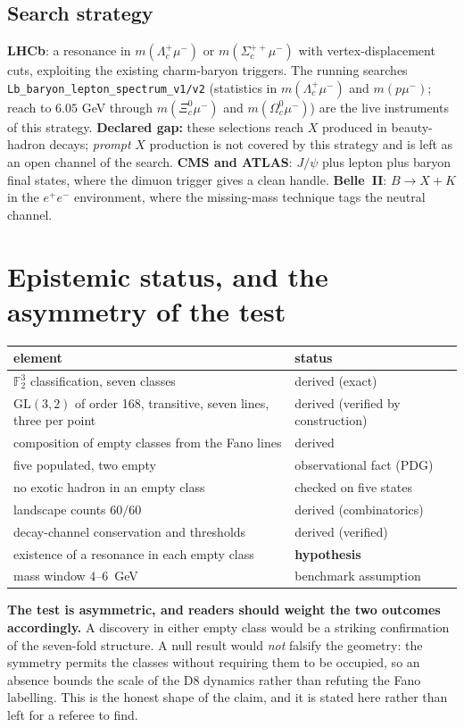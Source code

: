 \subsection{Search strategy}
\textbf{LHCb}: a resonance in $m(\Lambda_c^+\mu^-)$ or $m(\Sigma_c^{++}\mu^-)$ with vertex-displacement cuts, exploiting the existing charm-baryon triggers. The running searches \texttt{Lb\_baryon\_lepton\_spectrum\_v1/v2} (statistics in $m(\Lambda_c^+\mu^-)$ and $m(p\mu^-)$; reach to $6.05$ GeV through $m(\Xi_c^0\mu^-)$ and $m(\Omega_c^0\mu^-)$) are the live instruments of this strategy. \textbf{Declared gap:} these selections reach $X$ produced in beauty-hadron decays; \emph{prompt} $X$ production is not covered by this strategy and is left as an open channel of the search. \textbf{CMS and ATLAS}: $J/\psi$ plus lepton plus baryon final states, where the dimuon trigger gives a clean handle. \textbf{Belle~II}: $B\to X+K$ in the $e^+e^-$ environment, where the missing-mass technique tags the neutral channel.

\section{Epistemic status, and the asymmetry of the test}
\begin{center}\small
\begin{tabular}{ll}\toprule
element & status\\\midrule
$\mathbb F_2^3$ classification, seven classes & derived (exact)\\
$\mathrm{GL}(3,2)$ of order 168, transitive, seven lines, three per point & derived (verified by construction)\\
composition of empty classes from the Fano lines & derived\\
five populated, two empty & observational fact (PDG)\\
no exotic hadron in an empty class & checked on five states\\
landscape counts $60/60$ & derived (combinatorics)\\
decay-channel conservation and thresholds & derived (verified)\\
existence of a resonance in each empty class & \textbf{hypothesis}\\
mass window $4$--$6$~GeV & benchmark assumption\\\bottomrule
\end{tabular}
\end{center}
\textbf{The test is asymmetric, and readers should weight the two outcomes accordingly.} A discovery in either empty class would be a striking confirmation of the seven-fold structure. A null result would \emph{not} falsify the geometry: the symmetry permits the classes without requiring them to be occupied, so an absence bounds the scale of the D8 dynamics rather than refuting the Fano labelling. This is the honest shape of the claim, and it is stated here rather than left for a referee to find.

